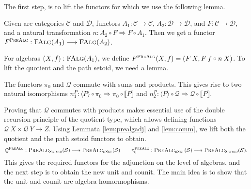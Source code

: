 \documentclass[9pt]{entcs}
\newcommand{\type}[1]{\textsc{#1}}
\newcommand{\category}[1]{\textsc{#1}}
\newcommand{\hset}{\type{hSet}} %
\newcommand{\0}{\textbf{0}} %
\newcommand{\compm}[2]{#2 \circ #1} %
\newcommand{\setoids}{\category{Setoid}} %
\newcommand{\functor}[2]{#1 \longrightarrow #2} %
\newcommand{\compf}[2]{#2 \circ #1} %
\newcommand{\nattrans}[2]{#1 \Longrightarrow #2} %
\newcommand{\falg}[1]{\category{FAlg}(#1)} %
\newcommand{\sig}{\mathcal{S}} %
\newcommand{\semP}[1]{\llbracket #1 \rrbracket} %
\newcommand{\prealg}[1]{\category{PreAlg}_{\hset}(#1)} %
\newcommand{\semPT}[1]{\langle #1 \rangle} %
\newcommand{\prealgst}[1]{\category{PreAlg}_{\setoids}(#1)} %
\newcommand{\quotF}{\mathcal{Q}}
\newcommand{\pathF}{\pi_0}
\newcommand{\quotPA}{\mathcal{Q}^{\category{PreAlg}}}
\newcommand{\pathPA}{\pi^{\category{PreAlg}}_0}
\begin{document}
The first step, is to lift the functors for which we use the following lemma.

\begin{lemma}
\label{lem:prealgadj}
Given are categories $\mathcal{C}$ and $\mathcal{D}$, functors $A_1 : \functor{\mathcal{C}}{\mathcal{C}}$, $A_2 : \functor{\mathcal{D}}{\mathcal{D}}$, and $F : \functor{\mathcal{C}}{\mathcal{D}}$, and a natural transformation $n : \nattrans{\compf{F}{A_2}}{\compf{A_1}{F}}$.
Then we get a functor $F^{\category{PreAlg}} : \functor{\falg{A_1}}{\falg{A_2}}$.
\end{lemma}

For algebras $(X, f) : \falg{A_1}$, we define $F^{\category{PreAlg}}(X,f) = (F \> X, \compm{n \> X}{F \> f})$.
To lift the quotient and the path setoid, we need a lemma.

\begin{lemma}
\label{lem:comm}
The functors $\pathF$ and $\quotF$ commute with sums and products.
This gives rise to two natural isomorphisms $n_1^P : \nattrans{\compf{\pathF}{\semPT{P}}}{\compf{\semP{P}}{\pathF}}$ and $n_2^P : \nattrans{\compf{\quotF}{\semPT{P}}}{\compf{\semP{P}}{\quotF}}$.
\end{lemma}

Proving that $\quotF$ commutes with products makes essential use of the double recursion principle of the quotient type, which allows defining functions $\quotF \> X \times \quotF \> Y \rightarrow Z$.
Using Lemmata \ref{lem:prealgadj} and \ref{lem:comm}, we lift both the quotient and the path setoid functors to obtain.
\[
\quotPA : \functor{\prealgst{\sig}}{\prealg{\sig}}
\quad \quad
\pathPA : \functor{\prealg{\sig}}{\prealgst{\sig}}.
\]
This gives the required functors for the adjunction on the level of algebras, and the next step is to obtain the new unit and counit.
The main idea is to show that the unit and counit are algebra homormophisms.
\end{document}
